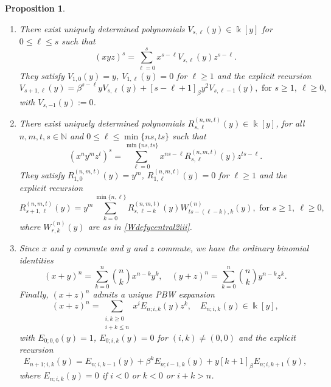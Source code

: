 \documentclass{amsart}
\newtheorem{proposition}[theorem]{Proposition}
\theoremstyle{definition}
\theoremstyle{remark}
\numberwithin{equation}{section}
\begin{document}
\begin{proposition}
\begin{enumerate}
\item[\rm (3)] There exist uniquely determined polynomials $V_{s,\ell}(y)\in\Bbbk[y]$ for $0\le \ell\le s$ such that
\begin{equation}\label{Vdefycentral2iii}
(xyz)^s=\sum_{\ell=0}^{s} x^{s-\ell}V_{s,\ell}(y)z^{s-\ell}.
\end{equation}
They satisfy $V_{1,0}(y)=y$, $V_{1,\ell}(y)=0$ for $\ell\ge 1$ and the explicit recursion
\begin{equation}\label{Vrecycentral2iii}
V_{s+1,\ell}(y)=\beta^{s-\ell}yV_{s,\ell}(y)+[s-\ell+1]_\beta y^{2}V_{s,\ell-1}(y),\text{ for } s\ge 1,\ \ell\ge 0,
\end{equation}
with $V_{s,-1}(y):=0$.

\item[\rm (4)] There exist uniquely determined polynomials
$R^{(n,m,t)}_{s,\ell}(y)\in\Bbbk[y]$, for all $n,m,t,s\in\mathbb{N}$ and $0\le \ell\le \min\{ns,ts\}$ such that
\begin{equation}\label{Rdefycentral2iii}
(x^n y^m z^t)^s=\sum_{\ell=0}^{\min\{ns,ts\}} x^{ns-\ell}R^{(n,m,t)}_{s,\ell}(y)z^{ts-\ell}.
\end{equation}
They satisfy $R^{(n,m,t)}_{1,0}(y)=y^{m}$, $R^{(n,m,t)}_{1,\ell}(y)=0$ for $\ell\ge 1$ and the explicit recursion
\begin{equation}\label{Rrecycentral2iii}
R^{(n,m,t)}_{s+1,\ell}(y)=y^{m}\sum_{k=0}^{\min\{n,\ell\}}R^{(n,m,t)}_{s,\ell-k}(y)W^{(n)}_{ts-(\ell-k), k}(y), \text{ for } s\ge 1,\ \ell\ge 0,
\end{equation}
where $W^{(n)}_{r,k}(y)$ are as in \eqref{Wdefycentral2iii}.

\item[\rm (5)] Since $x$ and $y$ commute and $y$ and $z$ commute, we have the ordinary binomial identities
\[
(x+y)^n=\sum_{k=0}^{n}\binom{n}{k}x^{n-k}y^k,\quad (y+z)^n=\sum_{k=0}^{n}\binom{n}{k}y^{n-k}z^k.
\]
Finally, $(x+z)^n$ admits a unique PBW expansion
\begin{equation}\label{Edefycentral2iii}
(x+z)^n=\sum_{\substack{i,k\ge 0\\ i+k\le n}} x^{i}E_{n;i,k}(y)z^{k}, \quad E_{n;i,k}(y)\in\Bbbk[y],
\end{equation}
with $E_{0;0,0}(y)=1$, $E_{0;i,k}(y)=0$ for $(i,k)\neq(0,0)$ and the explicit recursion
\begin{equation}\label{Erecycentral2iii}
E_{n+1;i,k}(y) = E_{n;i,k-1}(y)+\beta^{k} E_{n;i-1,k}(y)+y[k+1]_{\beta} E_{n;i,k+1}(y),
\end{equation}
where $E_{n;i,k}(y)=0$ if $i<0$ or $k<0$ or $i+k>n$.
\end{enumerate}
\end{proposition}
\end{document}
